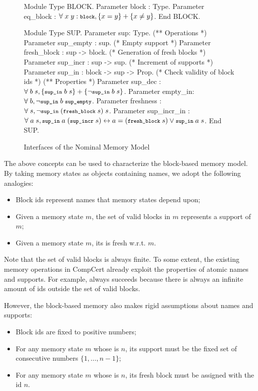 \begin{figure}[t]
\begin{coq}
  Module Type BLOCK.
    Parameter block : Type.
    Parameter eq_block : $\forall\; x\; y: \texttt{\footnotesize block}, \{x=y\} + \{x \neq y\}$.
  End BLOCK.

  Module Type SUP.
    Parameter sup: Type.
    (** Operations *)
    Parameter sup_empty : sup.  (* Empty support *)
    Parameter fresh_block : sup -> block.  (* Generation of fresh blocks *)
    Parameter sup_incr : sup -> sup.  (* Increment of supports *)
    Parameter sup_in : block -> sup -> Prop.   (* Check validity of block ids *)
    (** Properties *)
    Parameter sup_dec : $\forall\; b\; s, \{\texttt{\footnotesize sup\_in}\; b\; s\} + \{\neg \texttt{\footnotesize sup\_in}\; b\; s\}$.
    Parameter empty_in: $\forall\; b, \neg \texttt{\footnotesize sup\_in}\; b\; \texttt{\footnotesize sup\_empty}$.
    Parameter freshness : $\forall\; s, \neg \texttt{\footnotesize sup\_in}\; (\texttt{\footnotesize fresh\_block}\; s)\; s$.
    Parameter sup_incr_in : $\forall\; a\; s, \texttt{\footnotesize sup\_in}\; a\; (\texttt{\footnotesize sup\_incr}\; s) 
    \leftrightarrow a = (\texttt{\footnotesize fresh\_block}\; s) \lor \texttt{\footnotesize sup\_in}\; a\; s$.
  End SUP.  
\end{coq}
  \caption{Interfaces of the Nominal Memory Model}
  \label{fig:nm-interface}
\end{figure}

The above concepts can be used to characterize the block-based
memory model. By taking memory states as objects containing names, 
we adopt the following analogies:
%
\begin{itemize}\itemsep 0pt
\item Block ids represent names that memory states depend upon;
\item Given a memory state $m$, the set of valid blocks in $m$
  represents a support of $m$;
\item Given a memory state $m$, its \nextblock is fresh w.r.t. $m$.
\end{itemize}
%
Note that the set of valid blocks is always finite. To some extent, the
existing memory operations in CompCert already exploit the properties
of atomic names and supports. For example,
 always succeeds because there is always an infinite amount
of ids outside the set of valid blocks.

However, the block-based memory also makes rigid assumptions
about names and supports:
%
\begin{itemize} \itemsep 0pt
\item Block ids are fixed to positive numbers;
\item For any memory state $m$ whose \nextblock is $n$, its support
  must be the fixed set of consecutive numbers $\{1,\ldots,n-1\}$;
\item For any memory state $m$ whose \nextblock is $n$, its fresh
  block must be assigned with the id $n$.
\end{itemize}
%

